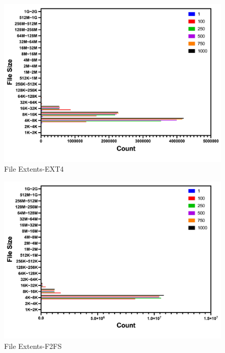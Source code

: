 \begin{figure}[t]
    \centering
	\includegraphics[width=0.95\columnwidth]{graphs/file_extents_ext4}
	\caption{File Extents-EXT4}
	\label{f:file_extents_ext4}
\end{figure}

\begin{figure}[t]
    \centering
	\includegraphics[width=0.95\columnwidth]{graphs/file_extents_f2fs}
	\caption{File Extents-F2FS}
	\label{f:file_extents_f2fs}
\end{figure}

